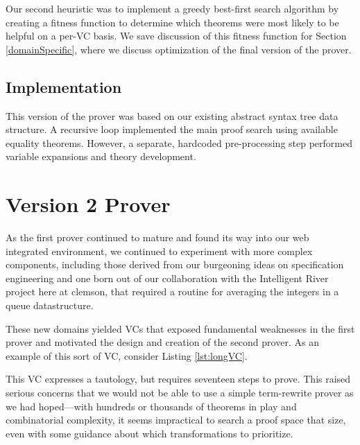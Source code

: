 Our second heuristic was to implement a greedy best-first search algorithm by creating a fitness function to determine which theorems were most likely to be helpful on a per-VC basis.  We save discussion of this fitness function for Section \ref{domainSpecific}, where we discuss optimization of the final version of the prover.

	\subsection{Implementation}

This version of the prover was based on our existing abstract syntax tree data structure.  A recursive loop implemented the main proof search using available equality theorems.  However, a separate, hardcoded pre-processing step performed variable expansions and theory development.


\section{Version 2 Prover\label{proverV2}}

As the first prover continued to mature and found its way into our web integrated environment, we continued to experiment with more complex components, including those derived from our burgeoning ideas on specification engineering\cite{specEngineering} and one born out of our collaboration with the Intelligent River project here at clemson, that required a routine for averaging the integers in a queue datastructure\cite{queueAverage}.  

These new domains yielded VCs that exposed fundamental weaknesses in the first prover and motivated the design and creation of the second prover.  As an example of this sort of VC, consider Listing \ref{lst:longVC}.



This VC expresses a tautology, but requires seventeen steps to prove.  This raised serious concerns that we would not be able to use a simple term-rewrite prover as we had hoped---with hundreds or thousands of theorems in play and combinatorial complexity, it seems impractical to search a proof space that size, even with some guidance about which transformations to prioritize.

